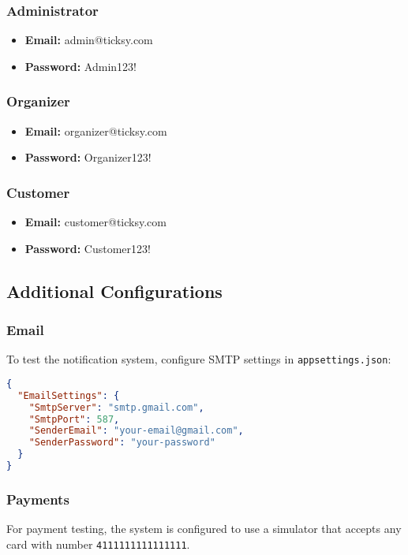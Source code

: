 \documentclass[12pt,a4paper]{article}
\begin{document}
\subsubsection{Administrator}
\begin{itemize}
    \item \textbf{Email:} admin@ticksy.com
    \item \textbf{Password:} Admin123!
\end{itemize}

\subsubsection{Organizer}
\begin{itemize}
    \item \textbf{Email:} organizer@ticksy.com
    \item \textbf{Password:} Organizer123!
\end{itemize}

\subsubsection{Customer}
\begin{itemize}
    \item \textbf{Email:} customer@ticksy.com
    \item \textbf{Password:} Customer123!
\end{itemize}

\subsection{Additional Configurations}

\subsubsection{Email}
To test the notification system, configure SMTP settings in \texttt{appsettings.json}:

\begin{lstlisting}[language=json]
{
  "EmailSettings": {
    "SmtpServer": "smtp.gmail.com",
    "SmtpPort": 587,
    "SenderEmail": "your-email@gmail.com",
    "SenderPassword": "your-password"
  }
}
\end{lstlisting}

\subsubsection{Payments}
For payment testing, the system is configured to use a simulator that accepts any card with number \texttt{4111111111111111}.
\end{document}
